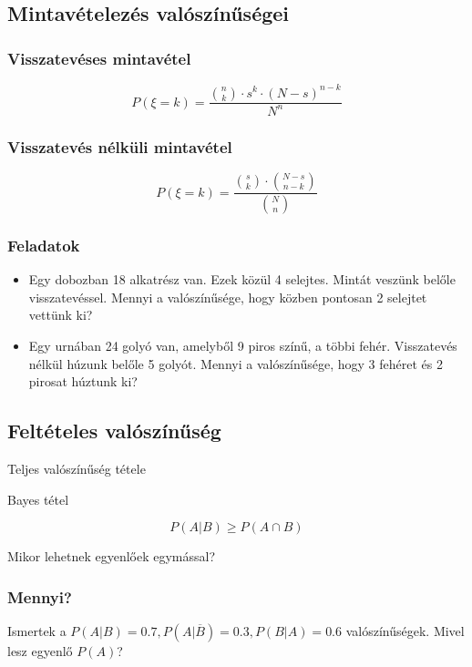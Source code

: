 \documentclass[a4paper]{article}
\begin{document}
\subsection{Mintavételezés valószínűségei}

\subsubsection{Visszatevéses mintavétel}

\[
\displaystyle
P(\xi = k) = \dfrac{\binom{n}{k} \cdot s^k \cdot (N - s)^{n-k}}{N^n}
\]

\subsubsection{Visszatevés nélküli mintavétel}

\[
\displaystyle
P(\xi = k) = \dfrac{\binom{s}{k} \cdot \binom{N - s}{n - k}}{\binom{N}{n}}
\]

\subsubsection{Feladatok}

\begin{itemize}
\item Egy dobozban 18 alkatrész van. Ezek közül 4 selejtes. Mintát veszünk belőle visszatevéssel.
Mennyi a valószínűsége, hogy közben pontosan 2 selejtet vettünk ki?
\item Egy urnában 24 golyó van, amelyből 9 piros színű, a többi fehér.
Visszatevés nélkül húzunk belőle 5 golyót.
Mennyi a valószínűsége, hogy 3 fehéret és 2 pirosat húztunk ki?
\end{itemize}

\subsection{Feltételes valószínűség}

Teljes valószínűség tétele

Bayes tétel

\[
P(A|B) \geq P(A \cap B)
\]

Mikor lehetnek egyenlőek egymással?

\subsubsection{Mennyi?}

Ismertek a $P(A|B) = 0.7, P(A|\overline{B}) = 0.3, P(B|A) = 0.6$ valószínűségek.
Mivel lesz egyenlő $P(A)$?
\end{document}
